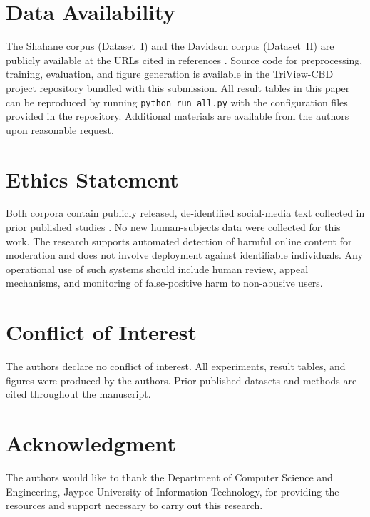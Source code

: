 \section*{Data Availability}
The Shahane corpus (Dataset~I) and the Davidson corpus (Dataset~II) are publicly available at the URLs cited in references \cite{ref10, ref11}. Source code for preprocessing, training, evaluation, and figure generation is available in the TriView-CBD project repository bundled with this submission. All result tables in this paper can be reproduced by running \texttt{python run\_all.py} with the configuration files provided in the repository. Additional materials are available from the authors upon reasonable request.

\section*{Ethics Statement}
Both corpora contain publicly released, de-identified social-media text collected in prior published studies \cite{ref10, ref11}. No new human-subjects data were collected for this work. The research supports automated detection of harmful online content for moderation and does not involve deployment against identifiable individuals. Any operational use of such systems should include human review, appeal mechanisms, and monitoring of false-positive harm to non-abusive users.

\section*{Conflict of Interest}
The authors declare no conflict of interest. All experiments, result tables, and figures were produced by the authors. Prior published datasets and methods are cited throughout the manuscript.
\section*{Acknowledgment}
The authors would like to thank the Department of Computer Science and Engineering, Jaypee University of Information Technology, for providing the resources and support necessary to carry out this research.
